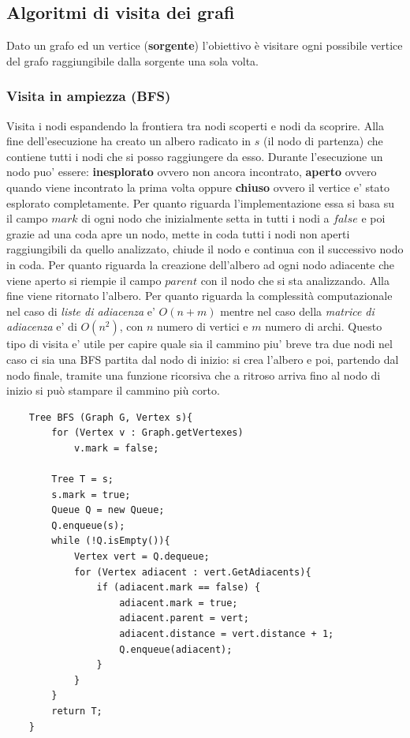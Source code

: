 \documentclass{article}
\begin{document}
\subsection{Algoritmi di visita dei grafi}
Dato un grafo ed un vertice (\textbf{sorgente}) l'obiettivo è visitare ogni possibile vertice del grafo raggiungibile dalla sorgente una sola volta.
\subsubsection{Visita in ampiezza (BFS)}
Visita i nodi espandendo la frontiera tra nodi scoperti e nodi da scoprire. Alla fine dell'esecuzione ha creato un albero radicato in $s$ (il nodo di partenza) che contiene tutti i nodi che si posso raggiungere da esso.
Durante l'esecuzione un nodo puo' essere: \textbf{inesplorato} ovvero non ancora incontrato, \textbf{aperto} ovvero quando viene incontrato la prima volta oppure \textbf{chiuso} ovvero il vertice e' stato esplorato completamente.
Per quanto riguarda l'implementazione essa si basa su il campo $mark$ di ogni nodo che inizialmente setta in tutti i nodi a $false$ e poi grazie ad una coda apre un nodo, mette in coda tutti i nodi non aperti raggiungibili da quello analizzato, chiude il nodo e continua con il successivo nodo in coda.
Per quanto riguarda la creazione dell'albero ad ogni nodo adiacente che viene aperto si riempie il campo $parent$ con il nodo che si sta analizzando. Alla fine viene ritornato l'albero.
Per quanto riguarda la complessità computazionale nel caso di \textit{liste di adiacenza} e' $O(n+m)$ mentre nel caso della \textit{matrice di adiacenza} e' di $O(n^2)$, con $n$ numero di vertici e $m$ numero di archi.
Questo tipo di visita e' utile per capire quale sia il cammino piu' breve tra due nodi nel caso ci sia una BFS partita dal nodo di inizio: 
si crea l'albero e poi, partendo dal nodo finale, tramite una funzione ricorsiva che a ritroso arriva fino al nodo di inizio si può stampare il cammino più corto.


\begin{verbatim}
    Tree BFS (Graph G, Vertex s){
        for (Vertex v : Graph.getVertexes)
            v.mark = false;
        
        Tree T = s;
        s.mark = true;
        Queue Q = new Queue;
        Q.enqueue(s);
        while (!Q.isEmpty()){
            Vertex vert = Q.dequeue;
            for (Vertex adiacent : vert.GetAdiacents){
                if (adiacent.mark == false) {
                    adiacent.mark = true;
                    adiacent.parent = vert;
                    adiacent.distance = vert.distance + 1;
                    Q.enqueue(adiacent);
                }
            }
        }
        return T;
    }
\end{verbatim}
\end{document}
